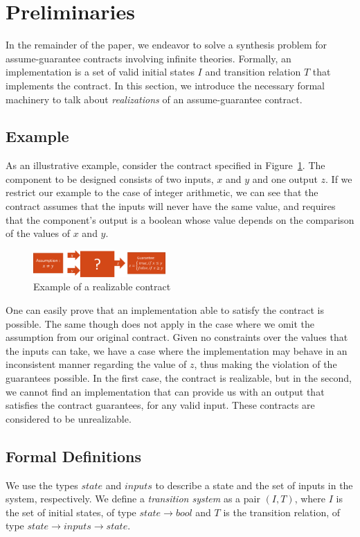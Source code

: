 \section{Preliminaries}
\label{sec:preliminaries}

In the remainder of the paper, we endeavor to solve a synthesis problem for
assume-guarantee contracts involving infinite theories.  Formally, an
implementation is a set of valid initial states $I$ and transition relation $T$ that implements the contract.  In this section, we introduce the necessary formal machinery to talk about {\em realizations} of an assume-guarantee contract.

\subsection{Example}
As an illustrative example, consider the contract specified in
Figure~\ref{fg:example}. The component to be designed consists of two
inputs, $x$ and $y$ and one output $z$. If we restrict our example to the case
of integer arithmetic, we can see that the contract assumes that the inputs will
never have the same value, and requires that the component's output is a boolean
whose value depends on the comparison of the values of $x$ and $y$.

\begin{figure}[H]
	\centering
	\includegraphics[width=0.45\textwidth,height=\textheight,keepaspectratio]{real1-crop}    	
	\caption{Example of a realizable contract}
	\label{fg:example}
\end{figure}


One can easily prove that an implementation able to satisfy the contract is
possible. The same though does not apply in the case where we omit the
assumption from our original contract. Given no constraints over the values that the inputs can take, we have a case where the implementation may
behave in an inconsistent manner regarding the value of $z$, thus making the
violation of the guarantees possible. In the first case, the contract is realizable, but in the second, we
cannot find an implementation that can provide us with an output that satisfies
the contract guarantees, for any valid input. These contracts are considered to
be unrealizable.

\subsection{Formal Definitions}
We use the types $state$ and $inputs$ to describe a state
and the set of inputs in the system, respectively. We define a
\textit{transition system} as a pair $(I,T)$, where $I$ is the set of initial states, of type $state \rightarrow
bool$ and $T$ is the transition relation, of type $state \rightarrow inputs
\rightarrow state$. 

